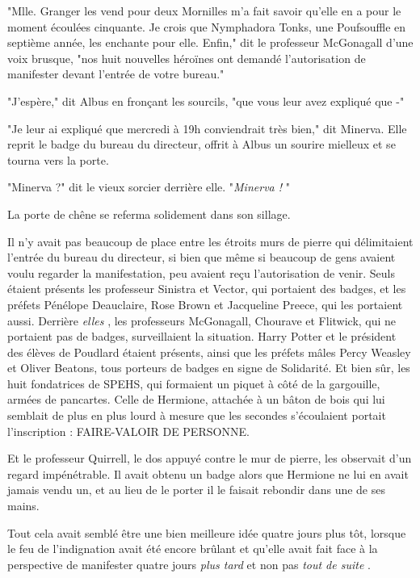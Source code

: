 "Mlle. Granger les vend pour deux Mornilles m'a fait savoir qu'elle en a pour le moment écoulées cinquante. Je crois que Nymphadora Tonks, une Poufsouffle en septième année, les enchante pour elle. Enfin," dit le professeur McGonagall d'une voix brusque, "nos huit nouvelles héroïnes ont demandé l'autorisation de manifester devant l'entrée de votre bureau."

"J'espère," dit Albus en fronçant les sourcils, "que vous leur avez expliqué que -"

"Je leur ai expliqué que mercredi à 19h conviendrait très bien," dit Minerva. Elle reprit le badge du bureau du directeur, offrit à Albus un sourire mielleux et se tourna vers la porte.

"Minerva ?" dit le vieux sorcier derrière elle. "\emph{Minerva !} "

La porte de chêne se referma solidement dans son sillage.

Il n'y avait pas beaucoup de place entre les étroits murs de pierre qui délimitaient l'entrée du bureau du directeur, si bien que même si beaucoup de gens avaient voulu regarder la manifestation, peu avaient reçu l'autorisation de venir. Seuls étaient présents les professeur Sinistra et Vector, qui portaient des badges, et les préfets Pénélope Deauclaire, Rose Brown et Jacqueline Preece, qui les portaient aussi. Derrière \emph{elles} , les professeurs McGonagall, Chourave et Flitwick, qui ne portaient pas de badges, surveillaient la situation. Harry Potter et le président des élèves de Poudlard étaient présents, ainsi que les préfets mâles Percy Weasley et Oliver Beatons, tous porteurs de badges en signe de Solidarité. Et bien sûr, les huit fondatrices de SPEHS, qui formaient un piquet à côté de la gargouille, armées de pancartes. Celle de Hermione, attachée à un bâton de bois qui lui semblait de plus en plus lourd à mesure que les secondes s'écoulaient portait l'inscription : FAIRE-VALOIR DE PERSONNE.

Et le professeur Quirrell, le dos appuyé contre le mur de pierre, les observait d'un regard impénétrable. Il avait obtenu un badge alors que Hermione ne lui en avait jamais vendu un, et au lieu de le porter il le faisait rebondir dans une de ses mains.

Tout cela avait semblé être une bien meilleure idée quatre jours plus tôt, lorsque le feu de l'indignation avait été encore brûlant et qu'elle avait fait face à la perspective de manifester quatre jours \emph{plus tard}  et non pas \emph{tout de suite} .

